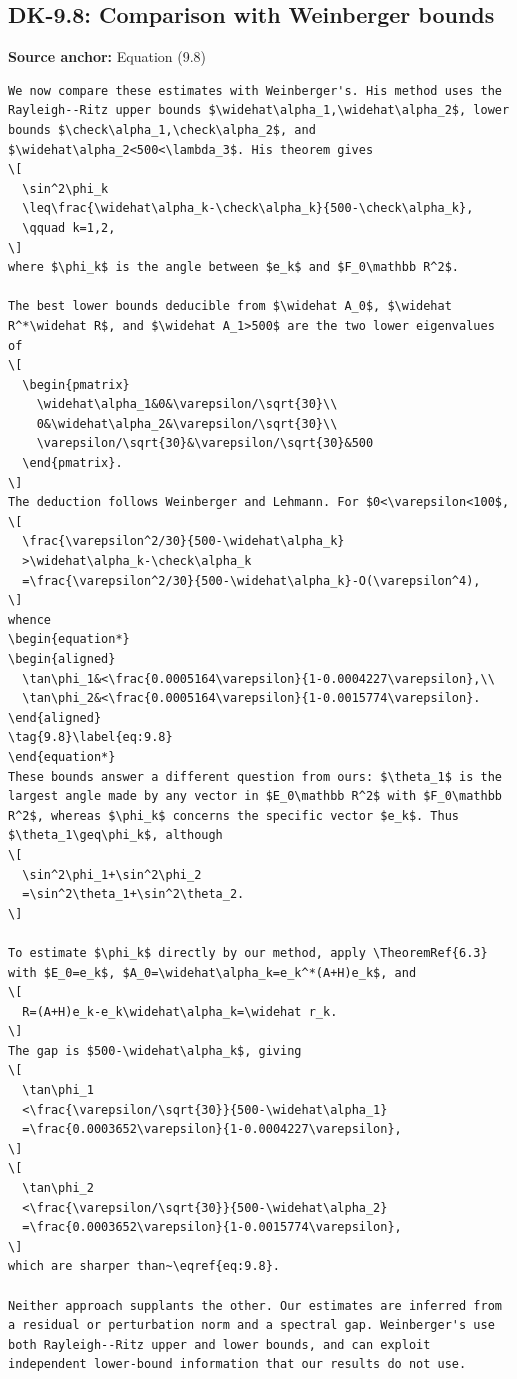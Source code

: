 \subsection*{DK-9.8: Comparison with Weinberger bounds}
\noindent\textbf{Source anchor:} Equation (9.8)\\
\begin{verbatim}
We now compare these estimates with Weinberger's. His method uses the Rayleigh--Ritz upper bounds $\widehat\alpha_1,\widehat\alpha_2$, lower bounds $\check\alpha_1,\check\alpha_2$, and $\widehat\alpha_2<500<\lambda_3$. His theorem gives
\[
  \sin^2\phi_k
  \leq\frac{\widehat\alpha_k-\check\alpha_k}{500-\check\alpha_k},
  \qquad k=1,2,
\]
where $\phi_k$ is the angle between $e_k$ and $F_0\mathbb R^2$.

The best lower bounds deducible from $\widehat A_0$, $\widehat R^*\widehat R$, and $\widehat A_1>500$ are the two lower eigenvalues of
\[
  \begin{pmatrix}
    \widehat\alpha_1&0&\varepsilon/\sqrt{30}\\
    0&\widehat\alpha_2&\varepsilon/\sqrt{30}\\
    \varepsilon/\sqrt{30}&\varepsilon/\sqrt{30}&500
  \end{pmatrix}.
\]
The deduction follows Weinberger and Lehmann. For $0<\varepsilon<100$,
\[
  \frac{\varepsilon^2/30}{500-\widehat\alpha_k}
  >\widehat\alpha_k-\check\alpha_k
  =\frac{\varepsilon^2/30}{500-\widehat\alpha_k}-O(\varepsilon^4),
\]
whence
\begin{equation*}
\begin{aligned}
  \tan\phi_1&<\frac{0.0005164\varepsilon}{1-0.0004227\varepsilon},\\
  \tan\phi_2&<\frac{0.0005164\varepsilon}{1-0.0015774\varepsilon}.
\end{aligned}
\tag{9.8}\label{eq:9.8}
\end{equation*}
These bounds answer a different question from ours: $\theta_1$ is the largest angle made by any vector in $E_0\mathbb R^2$ with $F_0\mathbb R^2$, whereas $\phi_k$ concerns the specific vector $e_k$. Thus $\theta_1\geq\phi_k$, although
\[
  \sin^2\phi_1+\sin^2\phi_2
  =\sin^2\theta_1+\sin^2\theta_2.
\]

To estimate $\phi_k$ directly by our method, apply \TheoremRef{6.3} with $E_0=e_k$, $A_0=\widehat\alpha_k=e_k^*(A+H)e_k$, and
\[
  R=(A+H)e_k-e_k\widehat\alpha_k=\widehat r_k.
\]
The gap is $500-\widehat\alpha_k$, giving
\[
  \tan\phi_1
  <\frac{\varepsilon/\sqrt{30}}{500-\widehat\alpha_1}
  =\frac{0.0003652\varepsilon}{1-0.0004227\varepsilon},
\]
\[
  \tan\phi_2
  <\frac{\varepsilon/\sqrt{30}}{500-\widehat\alpha_2}
  =\frac{0.0003652\varepsilon}{1-0.0015774\varepsilon},
\]
which are sharper than~\eqref{eq:9.8}.

Neither approach supplants the other. Our estimates are inferred from a residual or perturbation norm and a spectral gap. Weinberger's use both Rayleigh--Ritz upper and lower bounds, and can exploit independent lower-bound information that our results do not use.
\end{verbatim}

